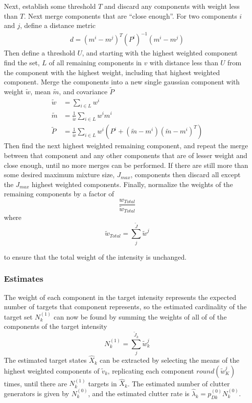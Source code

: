\documentclass{article}
\begin{document}
Next, establish some threshold $T$ and discard any components with weight less than $T$. Next merge components that are ``close enough''. For two components $i$ and $j$, define a distance metric
\begin{align}
  \label{eq:gauss_dist}
  d = (m^i - m^j)^T(P^i)^{-1}(m^i - m^j)
\end{align}
Then define a threshold $U$, and starting with the highest weighted component find the set, $L$ of all remaining components in $v$ with distance less than $U$ from the component with the highest weight, including that highest weighted component. Merge the components into a new single gaussian component with weight $\tilde{w}$, mean $\tilde{m}$, and covariance $\tilde{P}$
\begin{align}
  \tilde{w} &= \sum_{i \in L}w^i \label{eq:gauss_merge_w}\\
  \tilde{m} &= \frac{1}{\tilde{w}}\sum_{i \in L}w^im^i \label{eq:gauss_merge_m}\\
  \tilde{P} &= \frac{1}{\tilde{w}}\sum_{i \in L}w^i(P^i + (\tilde{m} - m^i)(\tilde{m} - m^i)^T) \label{eq:gauss_merge_P}
\end{align}
Then find the next highest weighted remaining component, and repeat the merge between that component and any other components that are of lesser weight and close enough, until no more merges can be performed. If there are still more than some desired maximum mixture size, $J_{max}$, components then discard all except the $J_{max}$ highest weighted components. Finally, normalize the weights of the remaining components by a factor of
\begin{equation}
  \label{eq:wnorm}
  \frac{w_{Total}}{\tilde{w}_{Total}}
\end{equation}
where
\begin{equation}
  \label{eq:wtild_total}
  \tilde{w}_{Total} = \sum_j^{\tilde{J}}\tilde{w}^j
\end{equation}

to ensure that the total weight of the intensity is unchanged.

\subsubsection*{Estimates}
The weight of each component in the target intensity represents the expected number of targets that component represents, so the estimated cardinality of the target set $N_k^{(1)}$ can now be found by summing the weights of all of of the components of the target intensity
\begin{equation}
  \label{eq:N1k}
  N_k^{(1)} = \sum_j^{\tilde{J}_k}\tilde{w}_k^j
\end{equation}
The estimated target states $\hat{X}_k$ can be extracted by selecting the means of the highest weighted components of $\tilde{v}_k$, replicating each component $round(\tilde{w}_K^j)$ times, until there are $N_k^{(1)}$ targets in $\hat{X}_k$. The estimated number of clutter generators is given by $N_k^{(0)}$, and the estimated clutter rate is $\hat{\lambda}_k = p_{Dk}^{(0)}N_k^{(0)}$.
\end{document}
